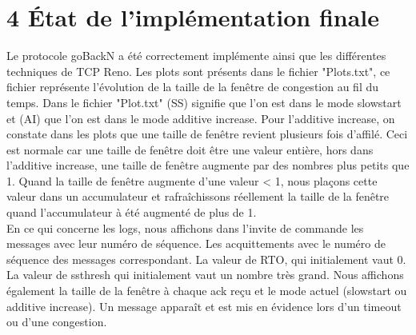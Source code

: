 \documentclass{report}
\begin{document}
\section*{ 4 État de l'implémentation finale }
Le protocole goBackN a été correctement implémente ainsi que les différentes techniques de TCP Reno. Les plots sont présents dans le fichier "Plots.txt", ce fichier représente l'évolution de la taille de la fenêtre de congestion au fil du temps. Dans le fichier "Plot.txt" (SS) signifie que l'on est dans le mode slowstart et (AI) que l'on est dans le mode additive increase. Pour l'additive increase, on constate dans les plots que une taille de fenêtre revient plusieurs fois d'affilé. Ceci est normale car une taille de fenêtre doit être une valeur entière, hors dans l'additive increase, une taille de fenêtre augmente par des nombres plus petits que 1. Quand la taille de fenêtre augmente d'une valeur < 1, nous plaçons cette valeur dans un accumulateur et rafraîchissons réellement la taille de la fenêtre quand l'accumulateur à été augmenté de plus de 1.\\

En ce qui concerne les logs, nous affichons dans l'invite de commande les messages avec leur numéro de séquence. Les acquittements avec le numéro de séquence des messages correspondant. La valeur de RTO, qui initialement vaut 0. La valeur de ssthresh qui initialement vaut un nombre très grand. Nous affichons également la taille de la fenêtre à chaque ack reçu et le mode actuel (slowstart ou additive increase). Un message apparaît et est mis en évidence lors d'un timeout ou d'une congestion.
\end{document}
